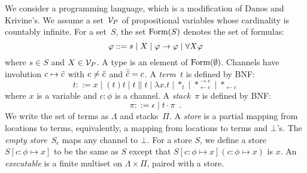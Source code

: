 
\newcommand{\conc}{\parallel}
\newcommand{\comod}[2]{\ast^{\rightarrow {#2}}_{\leftarrow{#1}}}
\newcommand{\reader}[1]{\ast_{\leftarrow{#1}}}

We consider a programming language, which is a modification of
Danos and Krivine's.
We assume a set~$\mathcal V_P$ of propositional variables whose cardinality is
countably infinite.
For a set~$S$,
the set $\mathop{\text{Form}}(S)$ denotes the set of formulas:
\[
\varphi::= s \mid X \mid \varphi\rightarrow\varphi\mid \forall X \varphi
\]
where $s\in S$ and $X\in \mathcal V_P$.
A type is an element of $\mathop{\text{Form}}(\emptyset)$.
Channels have involution $c\mapsto\bar{c}$ with
$c\neq \bar{c}$ and
$\bar{\bar{c}} = c$.
A \textit{term}~$t$ is defined by BNF:
\[
 t::= x
 \mid (t)t
 \mid t\conc t
 \mid \lambda x.t
 \mid \ast_t
 \mid \comod c c
 \mid \reader  c
\]
where $x$ is a variable and $c\colon\phi$ is a channel.
A \textit{stack}~$\pi$ is defined by BNF:
\[
 \pi ::= \epsilon
 \mid t\cdot \pi
 \enspace.
\]
We write the set of terms as $\Lambda$ and stacks~$\Pi$.
A \textit{store} is a partial mapping from locations to
terms, equivalently, a mapping from locations to terms and $\bot$'s.
The \textit{empty store}~$S_\epsilon$ maps any channel to $\bot$.
For a store $S$, we define a store $S[c\colon\phi\mapsto x]$ to be
the same as $S$ except that $S[c\colon\phi\mapsto x](c\colon\phi\mapsto
x)$ is $x$.
An \textit{executable} is a finite multiset on $\Lambda \times \Pi$,
paired with a store.

